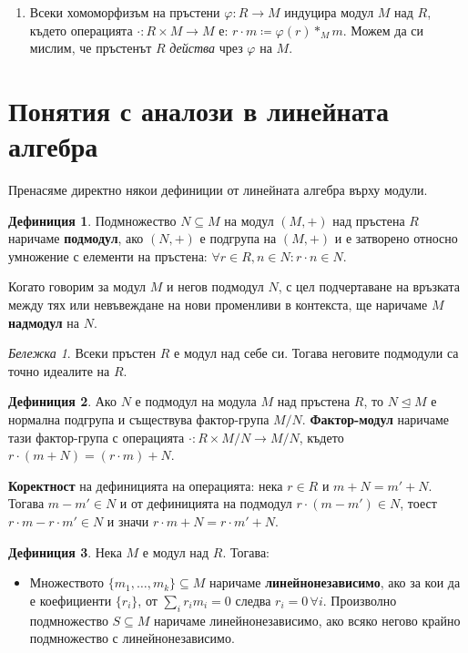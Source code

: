 \documentclass{article}
\newif\ifusemulticols
\newcommand\newterm[1]{\textbf{#1}}
\theoremstyle{definition}
\newtheorem{deff}{Дефиниция}
\theoremstyle{remark}
\newtheorem*{note}{Бележка}
\theoremstyle{plain}
\theoremstyle{plain}
\newenvironment{mymulticols}
    { \ifusemulticols \begin{multicols}{2} \fi }
    { \ifusemulticols \end{multicols} \fi }
\begin{document}
\begin{mymulticols}
\begin{enumerate}
    \item Всеки хомоморфизъм на пръстени ${\varphi: R \to M}$ индуцира модул $M$ над $R$, където
        операцията ${\cdot: R \times M \to M}$ е: $r \cdot m \coloneqq \varphi(r) *_M m$. Можем да си
        мислим, че пръстенът $R$ \emph{действа} чрез $\varphi$ на $M$.
\end{enumerate}

\section{Понятия с аналози в линейната алгебра}
Пренасяме директно някои дефиниции от линейната алгебра върху модули.

\begin{deff}
    Подмножество $N \subseteq M$ на модул $(M, +)$ над пръстена $R$ наричаме \newterm{подмодул}, ако $(N, +)$ е подгрупа на $(M, +)$ и е затворено относно умножение с елементи на пръстена: $\forall r \in R, n \in N: r\cdot n \in N$.

    Когато говорим за модул $M$ и негов подмодул $N$, с цел подчертаване на връзката между тях или невъвеждане на нови променливи в контекста, ще наричаме $M$ \newterm{надмодул} на $N$.
\end{deff}

\begin{note}
    Всеки пръстен $R$ е модул над себе си. Тогава неговите подмодули са точно идеалите на $R$.
\end{note}

\begin{deff}
    Ако $N$ е подмодул на модула $M$ над пръстена $R$, то $N \trianglelefteq M$ е нормална подгрупа и съществува фактор-група $M/N$. \newterm{Фактор-модул} наричаме тази фактор-група с операцията $\cdot:R \times M/N \to M/N$, където $r\cdot (m + N) = (r \cdot m) + N$.
\end{deff}

\textbf{Коректност} на дефиницията на операцията: нека $r \in R$ и $m + N = m' + N$.
Тогава $m - m' \in N$ и от дефиницията на подмодул $r \cdot (m - m') \in N$, тоест $r \cdot m - r \cdot m' \in N $ и значи $r\cdot m + N = r\cdot m' + N$.

\begin{deff}
    Нека $M$ е модул над $R$. Тогава:
    \begin{itemize}
        \item Множеството $\{ m_1, \dots, m_k \} \subseteq M$ наричаме \newterm{линейнонезависимо}, ако за кои да е коефициенти $\{ r_i \}$, от $\sum_i r_i m_i = 0$ следва $r_i = 0 \, \forall i$. Произволно подмножество $S \subseteq M$ наричаме линейнонезависимо, ако всяко негово крайно подмножество с линейнонезависимо.


\end{itemize}
\end{deff}
\end{mymulticols}
\end{document}
